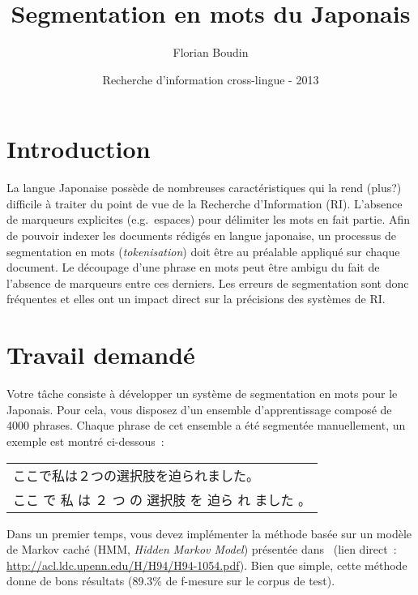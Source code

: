\documentclass[12pt,a4paper]{article}
\begin{document}
\title{Segmentation en mots du Japonais}
\author{Florian Boudin}
\date{Recherche d'information cross-lingue - 2013}

\maketitle

\section{Introduction}

La langue Japonaise possède de nombreuses caractéristiques qui la rend (plus?) difficile à traiter du point de vue de la Recherche d'Information (RI).
L'absence de marqueurs explicites (e.g.~espaces) pour délimiter les mots en fait partie.
Afin de pouvoir indexer les documents rédigés en langue japonaise, un processus de segmentation en mots (\textit{tokenisation}) doit être au préalable appliqué sur chaque document.
Le découpage d'une phrase en mots peut être ambigu du fait de l'absence de marqueurs entre ces derniers.
Les erreurs de segmentation sont donc fréquentes et elles ont un impact direct sur la précisions des systèmes de RI.

\section{Travail demandé}

Votre tâche consiste à développer un système de segmentation en mots pour le Japonais.
Pour cela, vous disposez d'un ensemble d'apprentissage composé de 4000 phrases.
Chaque phrase de cet ensemble a été segmentée manuellement, un exemple est montré ci-dessous~:

\begin{table}[h!]
\centering
\begin{CJK}{UTF8}{min}
\begin{tabular}{l}
    ここで私は２つの選択肢を迫られました。\\[0.5em]
    ここ \quad で \quad 私 \quad は \quad ２ \quad つ \quad の \quad 選択肢 \quad 
    を \quad 迫ら \quad れ \quad ました \quad 。
\end{tabular}
\end{CJK}
\end{table}

Dans un premier temps, vous devez implémenter la méthode basée sur un modèle de Markov caché (HMM, \textit{Hidden Markov Model}) présentée dans~\cite{lamport94} (lien direct~: \url{http://acl.ldc.upenn.edu/H/H94/H94-1054.pdf}).
Bien que simple, cette méthode donne de bons résultats (89.3\% de f-mesure sur le corpus de test).
\end{document}
